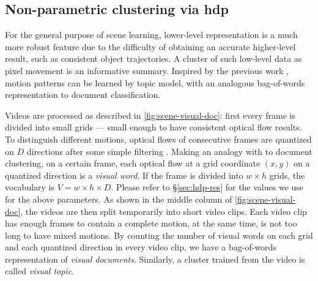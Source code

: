 \subsection{Non-parametric clustering via \gls{hdp}}
\label{subsec:hdp-bag-of-words}
For the general purpose of scene learning, lower-level representation is a much more robust feature due to the difficulty of obtaining an accurate higher-level result, such as consistent object trajectories. 
A cluster of such low-level data as pixel movement is an informative summary.
Inspired by the previous work \cite{wang2009unsupervised,kuettel2010s}, motion patterns can be learned by topic model, with an analogous bag-of-words representation to document classification.

Videos are processed as described in \ref{fig:scene-visual-doc}: first every frame is divided into small grids --- small enough to have consistent optical flow results. 
To distinguish different motions, optical flows of consecutive frames are quantized on $D$ directions after some simple filtering \cite{kalal2010forward}. 
Making an analogy with to document clustering, on a certain frame, each optical flow at a grid coordinate $(x, y)$ on a quantized direction is a \emph{visual word}.
If the frame is divided into $w\times h$ grids, the vocabulary is $V = w\times h\times D$.
Please refer to \S\ref{sec:hdp-res} for the values we use for the above parameters.
As shown in the middle column of \ref{fig:scene-visual-doc}, the videos are then split temporarily into short video clips. 
Each video clip has enough frames to contain a complete motion, at the same time, is not too long to have mixed motions. 
By counting the number of visual words on each grid and each quantized direction in every video clip, we have a bag-of-words representation of \emph{visual documents}. 
Similarly, a cluster trained from the video is called \emph{visual topic}.



